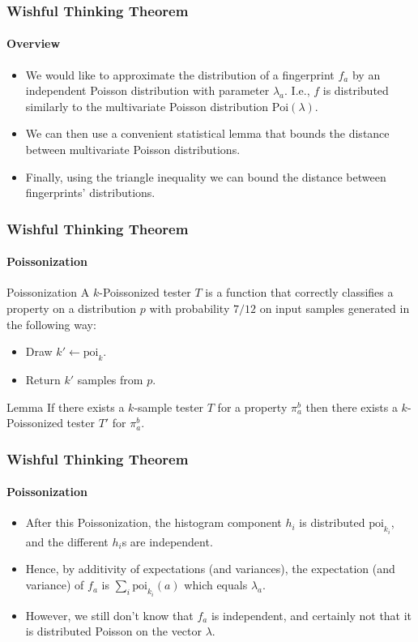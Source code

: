 \documentclass{beamer}
\begin{document}
\begin{frame}
  \frametitle{Wishful Thinking Theorem} \framesubtitle{Overview}

  \begin{itemize}
  \item We would like to approximate the distribution of a fingerprint
    $f_a$ by an independent Poisson distribution with parameter
    $\lambda_a$. I.e., $f$ is distributed similarly to the
    multivariate Poisson distribution $\mbox{Poi}(\lambda)$.
  \item We can then use a convenient statistical lemma that bounds the
    distance between multivariate Poisson distributions.
  \item Finally, using the triangle inequality we can bound the
    distance between fingerprints' distributions.
  \end{itemize}

\end{frame}

\begin{frame}
  \frametitle{Wishful Thinking Theorem} \framesubtitle{Poissonization}

  \begin{block}{Poissonization}
    A $k$-Poissonized tester $T$ is a function that correctly
    classifies a property on a distribution $p$ with probability
    $7/12$ on input samples generated in the following way:
    \begin{itemize}
    \item Draw $k'\leftarrow \mbox{poi}_k$.
    \item Return $k'$ samples from $p$.
    \end{itemize}
  \end{block}

  \begin{block}{Lemma}
    If there exists a $k$-sample tester $T$ for a property $\pi_a^b$
    then there exists a $k$-Poissonized tester $T'$ for $\pi_a^b$.
  \end{block}
  
\end{frame}

\begin{frame}
  \frametitle{Wishful Thinking Theorem} \framesubtitle{Poissonization}

  
  \begin{itemize}
  \item After this Poissonization, the histogram component $h_i$ is
    distributed $\mbox{poi}_{k_i}$, and the different $h_i$s are independent.
  \item Hence, by additivity of expectations (and variances), the
    expectation (and variance) of $f_a$ is $\sum_i\mbox{poi}_{k_i}(a)$
    which equals $\lambda_a$.

\item However, we still don't know that $f_a$ is independent, and certainly  not that it is distributed Poisson on the vector $\lambda$. 
 \end{itemize}
  
\end{frame}
\end{document}
